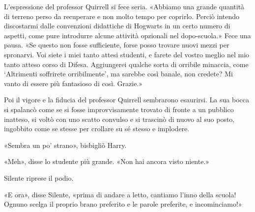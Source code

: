 L’espressione del professor Quirrell si fece seria. «Abbiamo una grande quantità di terreno perso da recuperare e non molto tempo per coprirlo. Perciò intendo discostarmi dalle convenzioni didattiche di Hogwarts in un certo numero di aspetti, come pure introdurre alcune attività opzionali nel dopo-scuola.» Fece una pausa. «Se questo non fosse sufficiente, forse posso trovare nuovi mezzi per spronarvi. Voi siete i miei tanto attesi studenti, e farete del vostro meglio nel mio tanto atteso corso di Difesa. Aggiungerei qualche sorta di orribile minaccia, come ‘Altrimenti soffrirete orribilmente’, ma sarebbe così banale, non credete? Mi vanto di essere più fantasioso di così. Grazie.»

Poi il vigore e la fiducia del professor Quirrell sembrarono esaurirsi. La sua bocca si spalancò come se si fosse improvvisamente trovato di fronte a un pubblico inatteso, si voltò con uno scatto convulso e si trascinò di nuovo al suo posto, ingobbito come se stesse per crollare su sé stesso e implodere.

«Sembra un po’ strano», bisbigliò Harry.

«Meh», disse lo studente più grande. «Non hai ancora visto niente.»

Silente riprese il podio.

«E ora», disse Silente, «prima di andare a letto, cantiamo l’inno della scuola! Ognuno scelga il proprio brano preferito e le parole preferite, e incominciamo!»



